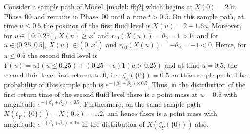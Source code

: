 Consider a sample path of Model~\ref{model: ffq2} which begins at \(X(0)=2\) in Phase~\(00\) and remains in Phase~\(00\) until a time \(t>0.5\). On this sample path, at time \(u\leq 0.5\) the position of the first fluid level is \(X(u)=2-1.6u\). Moreover, for \(u\in[0,0.25]\), \(X(u)\geq x^*\) and \(r_{00}(X(u))=\theta_2=1>0\), and for \(u\in(0.25,0.5]\), \(X(u)\in(0,x^*)\) and \(r_{00}(X(u))=-\theta_2=-1<0\). Hence, for \(u\leq 0.5\) the second fluid level is \(Y(u)=u1(u\leq 0.25)+(0.25-u)1(u>0.25)\) and at time \(u=0.5\), the second fluid level first returns to \(0\), i.e.~\(\zeta_{Y}(\{0\})=0.5\) on this sample path. The probability of this sample path is \(e^{-(\beta_1+\beta_2)\times 0.5}\). Thus, in the distribution of the first return time of the second fluid level there is a point mass at \(u=0.5\) with magnitude \(e^{-(\beta_1+\beta_2)\times 0.5}\). Furthermore, on the same sample path \(X(\zeta_Y(\{0\}))=X(0.5)=1.2\), and hence there is a point mass with magnitude \(e^{-(\beta_1+\beta_2)\times 0.5}\) in the distribution of \(X(\zeta_Y(\{0\}))\) also. 

